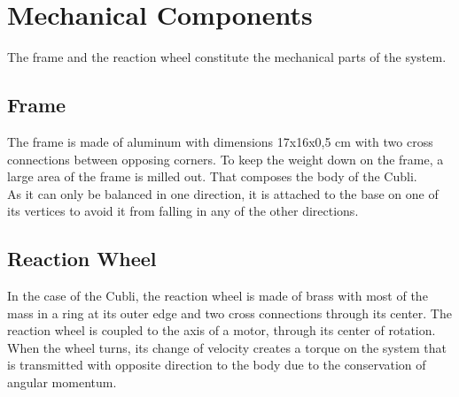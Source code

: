 \section{Mechanical Components}
The frame and the reaction wheel constitute the mechanical parts of the system.
\subsection{Frame}
The frame is made of aluminum with dimensions 17x16x0,5 \si{cm}  with two cross connections between opposing corners. To keep the weight down on the frame, a large area of the frame is milled out. That composes the body of the Cubli.\\
As it can only be balanced in one direction, it is attached to the base on one of its vertices to avoid it from falling in any of the other directions.
\subsection{Reaction Wheel}
In the case of the Cubli, the reaction wheel is made of brass with most of the mass in a ring at its outer edge and two cross connections through its center.
The reaction wheel is coupled to the axis of a motor, through its center of rotation. When the wheel turns, its change of velocity creates a torque on the system that is transmitted with opposite direction to the body due to the conservation of angular momentum.